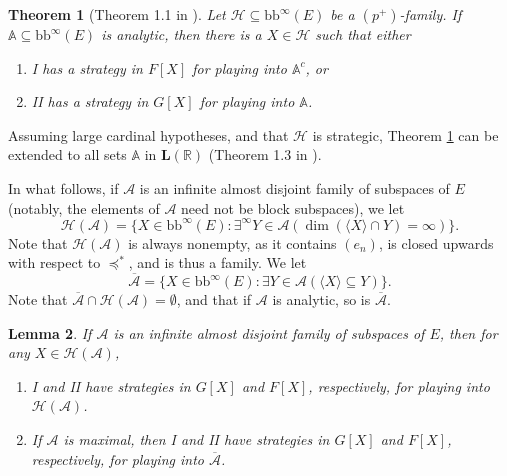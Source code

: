 \documentclass[11pt]{amsart}
\renewcommand{\bar}{\overline}
\newcommand{\R}{\mathbb{R}}
\newcommand{\A}{\mathbb{A}}
\newcommand{\LA}{\mathcal{A}}
\newtheorem{thm}{Theorem}[section]
\newtheorem{lemma}[thm]{Lemma}
\theoremstyle{definition}
\theoremstyle{remark}
\newcommand{\LH}{\mathcal{H}}
\newcommand{\bb}{\mathrm{bb}}
\renewcommand{\1}{\mathbf{1}}
\renewcommand{\L}{\mathbf{L}}
\begin{document}
\begin{thm}[Theorem 1.1 in \cite{MR3864398}]\label{thm:local_Rosendal}
	Let $\LH\subseteq\bb^\infty(E)$ be a $(p^+)$-family. If $\A\subseteq\bb^\infty(E)$ is analytic, then there is a $X\in\LH$ such that either
	\begin{enumerate}[label=\rm{(\roman*)}]
		\item I has a strategy in $F[X]$ for playing into $\A^c$, or
		\item II has a strategy in $G[X]$ for playing into $\A$.
	\end{enumerate}
\end{thm}

Assuming large cardinal hypotheses, and that $\LH$ is strategic, Theorem \ref{thm:local_Rosendal} can be extended to all sets $\A$ in $\L(\R)$ (Theorem 1.3 in \cite{MR3864398}).

In what follows, if $\LA$ is an infinite almost disjoint family of subspaces of $E$ (notably, the elements of $\LA$ need not be block subspaces), we let
\[
	\LH(\LA)=\{X\in\bb^\infty(E):\exists^\infty Y\in\LA(\dim(\langle X\rangle\cap Y)=\infty)\}.
\]
Note that $\LH(\LA)$ is always nonempty, as it contains $(e_n)$, is closed upwards with respect to $\preceq^*$, and is thus a family. We let
\[
	\bar{\LA}=\{X\in\bb^\infty(E):\exists Y\in\LA(\langle X\rangle\subseteq Y)\}. 
\]
Note that $\bar{\LA}\cap\LH(\LA)=\emptyset$, and that if $\LA$ is analytic, so is $\bar{\LA}$.

\begin{lemma}\label{lem:strats_H(A)}
	If $\LA$ is an infinite almost disjoint family of subspaces of $E$, then for any $X\in\LH(\LA)$,
	\begin{enumerate}
		\item I and II have strategies in $G[X]$ and $F[X]$, respectively, for playing into $\LH(\LA)$.
		\item If $\LA$ is maximal, then I and II have strategies in $G[X]$ and $F[X]$, respectively, for playing into $\bar{\LA}$.
	\end{enumerate}
\end{lemma}
\end{document}

